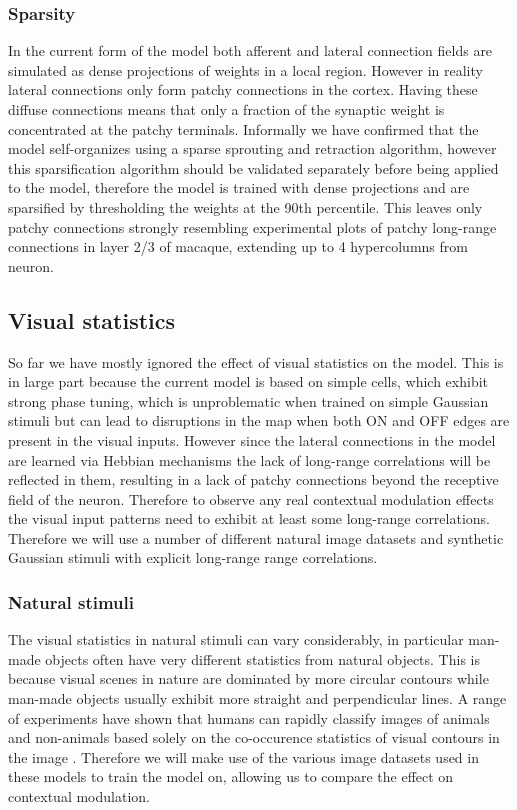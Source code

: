 \subsubsection{Sparsity}

In the current form of the model both afferent and lateral connection
fields are simulated as dense projections of weights in a local
region. However in reality lateral connections only form patchy
connections in the cortex. Having these diffuse connections means that
only a fraction of the synaptic weight is concentrated at the patchy
terminals. Informally we have confirmed that the model self-organizes
using a sparse sprouting and retraction algorithm, however this
sparsification algorithm should be validated separately before being
applied to the model, therefore the model is trained with dense
projections and are sparsified by thresholding the weights at the 90th
percentile. This leaves only patchy connections strongly resembling
experimental plots of patchy long-range connections in layer 2/3 of
macaque, extending up to 4 hypercolumns from neuron.

\subsection{Visual statistics}

So far we have mostly ignored the effect of visual statistics on the
model. This is in large part because the current model is based on
simple cells, which exhibit strong phase tuning, which is
unproblematic when trained on simple Gaussian stimuli but can lead to
disruptions in the map when both ON and OFF edges are present in the
visual inputs. However since the lateral connections in the model are
learned via Hebbian mechanisms the lack of long-range correlations
will be reflected in them, resulting in a lack of patchy connections
beyond the receptive field of the neuron. Therefore to observe any
real contextual modulation effects the visual input patterns need to
exhibit at least some long-range correlations. Therefore we will use a
number of different natural image datasets and synthetic Gaussian
stimuli with explicit long-range range correlations.

\subsubsection{Natural stimuli}

The visual statistics in natural stimuli can vary considerably, in
particular man-made objects often have very different statistics from
natural objects. This is because visual scenes in nature are dominated
by more circular contours while man-made objects usually exhibit more
straight and perpendicular lines. A range of experiments have shown
that humans can rapidly classify images of animals and non-animals
based solely on the co-occurence statistics of visual contours in the
image \citep{Serre2007, Perrinet2015}. Therefore we will make use of
the various image datasets used in these models to train the model on,
allowing us to compare the effect on contextual modulation.

